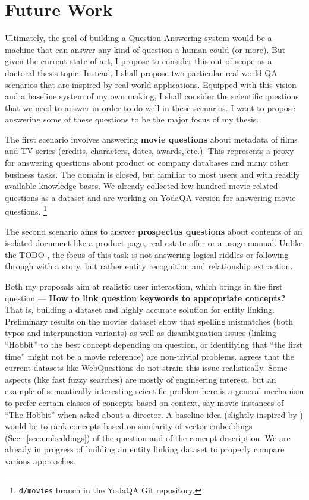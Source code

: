 \chapter{Future Work}
\label{ch:plan}

Ultimately, the goal of building a Question Answering system would
be a machine that can answer any kind of question a human could (or more).
But given the current state of art, I propose to consider this out of
scope as a doctoral thesis topic.  Instead, I shall propose two particular
real world QA scenarios that are inspired by real world applications.
Equipped with this vision and a baseline system of my own making,
I shall consider the scientific questions that we need
to answer in order to do well in these scenarios.  I want to propose
answering some of these questions to be the major focus of my thesis.

The first scenario involves answering \textbf{movie questions}
about metadata of films and TV series (credits, characters, dates,
awards, etc.).  This represents a proxy for answering questions about
product or company databases and many other business tasks.  The domain
is closed, but familiar to most users and with readily available knowledge
bases.  We already collected few hundred movie related questions as a dataset
and are working on YodaQA version for answering movie questions.%
\footnote{\texttt{d/movies} branch in the YodaQA Git repository.}

The second scenario aims to answer \textbf{prospectus questions}
about contents of an isolated document like a product page,
real estate offer or a usage manual.  Unlike the TODO \cite{MemNet},
the focus of this task is not answering logical riddles or following
through with a story, but rather entity recognition and relationship
extraction.

Both my proposals aim at realistic user interaction,
which brings in the first question ---
\textbf{How to link question keywords to appropriate concepts?}
That is, building a dataset and highly accurate solution for entity
linking. %
Preliminary results on the movies dataset show that spelling mismatches
(both typos and interpunction variants) as well as disambiguation issues
(linking ``Hobbit'' to the best concept depending on question,
or identifying that ``the first time'' might not be a movie reference)
are non-trivial problems.
\cite{LeanFreebaseYao} agrees that the current
datasets like WebQuestions do not strain this issue realistically.
Some aspects (like fast fuzzy searches) are mostly of engineering interest,
but an example of semantically interesting scientific problem here
is a general mechanism to prefer certain classes of concepts based
on context, say movie instances of ``The Hobbit'' when asked about a director.
A baseline idea (slightly inspired by \cite{QuASE}) would be to rank concepts
based on similarity of vector embeddings (Sec.~\ref{sec:embeddings})
of the question and of the concept description.
We are already in progress of building an entity linking dataset to properly
compare various approaches.


